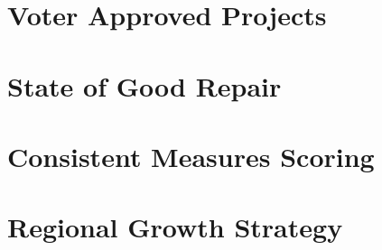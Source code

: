 \documentclass[10pt, letterpaper, final, twoside, onecolumn]{memoir}%
\begin{document}
\chapter{Voter Approved Projects}
\label{ch:voterapproved}

\chapter{State of Good Repair}
\label{ch:maintpres}

\chapter{Consistent Measures Scoring}
\label{ch:ninemeasures}

\chapter{Regional Growth Strategy}
\end{document}
